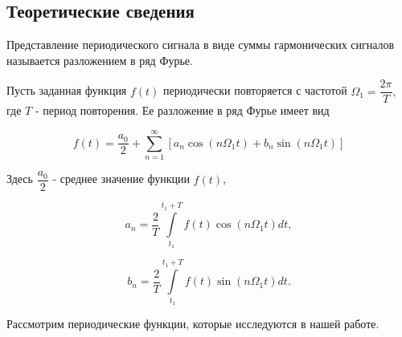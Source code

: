 \documentclass[12pt,a4paper]{article}
\begin{document}
	\subsection{Теоретические сведения}
	
	Представление периодического сигнала в виде суммы гармонических сигналов называется разложением в ряд Фурье.
	
	Пусть заданная функция $f(t)$ периодически повторяется с частотой $\Omega_{1}=\dfrac{2\pi}{T},$ где $T$ - период повторения. Ее разложение в ряд Фурье имеет вид
	
	$$ f(t)=\dfrac{a_{0}}{2}+ \sum\limits_{n=1}^\infty [a_{n}\cos(n \Omega_{1}t)+b_{n}\sin(n \Omega_{1} t) ]$$
	
	Здесь $\dfrac{a_{0}}{2}$ - среднее значение функции $f(t)$,
	
	$$ a_{n}=\dfrac{2}{T}\int\limits_{t_{1}}^{t_{1}+T}f(t)\cos(n \Omega_{1} t)dt, $$
	
	$$ b_{n}=\dfrac{2}{T}\int\limits_{t_{1}}^{t_{1}+T}f(t)\sin(n \Omega_{1} t)dt. $$
	
	
	Рассмотрим периодические функции, которые исследуются в нашей
	работе.
	
\end{document}
